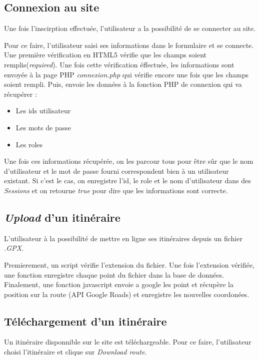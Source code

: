 \documentclass[a4paper]{article}
\newcommand{\bdd}{base de données}
\newcommand{\diag}[1]{}
\begin{document}
\subsection{Connexion au site}
Une fois l'inscirption effectuée, l'utilisateur a la possibilité de se connecter au site.

Pour ce faire, l'utilisateur saisi ses informations dans le formulaire et se connecte.
Une première vérification en HTML5 vérifie que les champs soient remplis(\emph{required}).
Une fois cette vérification éffectuée, les informations sont envoyée à la page PHP \emph{connexion.php} qui vérifie encore une fois que les champs soient rempli. Puis, envoie les données à la fonction PHP de connexion qui va récupérer :
\begin{itemize}
	\item Les ids utilisateur
	\item Les mots de passe
	\item Les roles
\end{itemize}

Une fois ces informations récupérée, on les parcour tous pour être sûr que le nom d'utilisateur et le mot de passe fourni correspondent bien à un utilisateur existant.
Si c'est le cas, on enregistre l'id, le role et le nom d'utilisateur dans des \emph{Sessions} et on retourne \emph{true} pour dire que les informations sont correcte.

\begin{center}
	\diag{Connexion}
\end{center}

\subsection{\emph{Upload} d'un itinéraire}
L'utilisateur à la possibilité de mettre en ligne ses itinéraires depuis un fichier \emph{.GPX}.

Premierement, un script vérifie l'extension du fichier. Une fois l'extension vérifiée, une fonction enregistre chaque point du fichier dans la \bdd. Finalement, une fonction javascript envoie a google les point et récupère la position sur la route (API Google Roads) et enregistre les nouvelles coordonées.

\begin{center}
	\diag{Gpx2Sql}
\end{center}


\subsection{Téléchargement d'un itinéraire}
Un itinéraire disponnible sur le site est téléchargeable.
Pour ce faire, l'utilisateur choisi l'itinéraire et clique sur \emph{Download route}.
\end{document}
